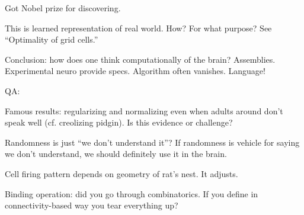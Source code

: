 Got Nobel prize for discovering.

This is learned representation of real world. How? For what purpose? See ``Optimality of grid cells.''

Conclusion: how does one think computationally of the brain? Assemblies. Experimental neuro provide specs. Algorithm often vanishes. Language!

QA:

Famous results: regularizing and normalizing even when adults around don't speak well (cf. creolizing pidgin). Is this evidence or challenge?

Randomness is just ``we don't understand it''? If randomness is vehicle for saying we don't understand, we should definitely use it in the brain.


Cell firing pattern depends on geometry of rat's nest. It adjusts. 

Binding operation: did you go through combinatorics. If you define in connectivity-based way you tear everything up?

